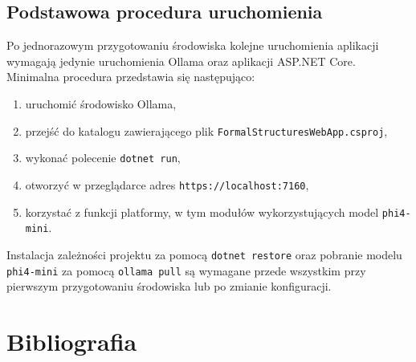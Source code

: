 \documentclass[12pt]{article}
\begin{document}
\subsection{Podstawowa procedura uruchomienia}

Po jednorazowym przygotowaniu środowiska kolejne uruchomienia aplikacji wymagają jedynie uruchomienia Ollama oraz aplikacji ASP.NET Core. Minimalna procedura przedstawia się następująco:

\begin{enumerate}
    \item uruchomić środowisko Ollama,
    \item przejść do katalogu zawierającego plik \texttt{FormalStructuresWebApp.csproj},
    \item wykonać polecenie \texttt{dotnet run},
    \item otworzyć w przeglądarce adres \texttt{https://localhost:7160},
    \item korzystać z funkcji platformy, w tym modułów wykorzystujących model \texttt{phi4-mini}.
\end{enumerate}

Instalacja zależności projektu za pomocą \texttt{dotnet restore} oraz pobranie modelu \texttt{phi4-mini} za pomocą \texttt{ollama pull} są wymagane przede wszystkim przy pierwszym przygotowaniu środowiska lub po zmianie konfiguracji.


\clearpage
\section*{Bibliografia}
\end{document}
